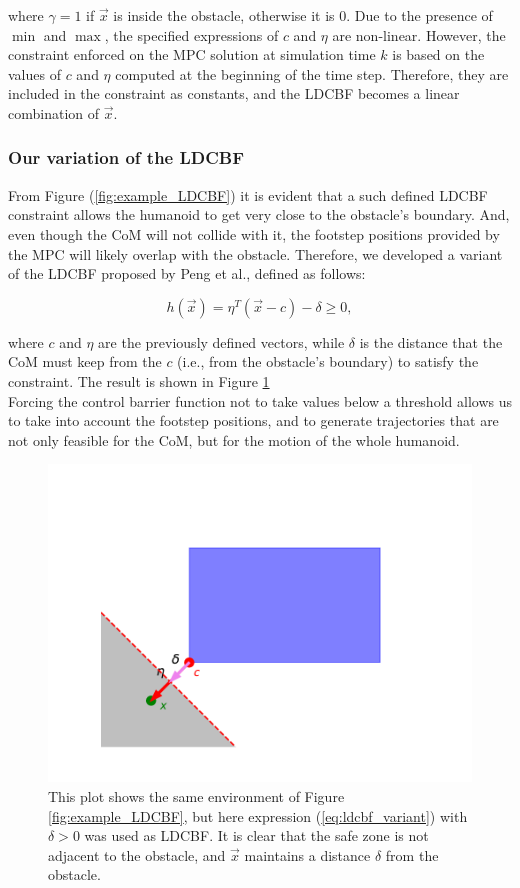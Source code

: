 where $\gamma=1$ if $\vec{x}$ is inside the obstacle, otherwise it is $0$.
Due to the presence of $\min$ and $\max$, the specified expressions of $c$ and $\eta$ are non-linear. However, the constraint enforced on the MPC solution at simulation time $k$ is based on the values of $c$ and $\eta$ computed at the beginning of the time step. Therefore, they are included in the constraint as constants, and the LDCBF becomes a linear combination of $\vec{x}$.

\subsubsection{Our variation of the LDCBF}
From Figure (\ref{fig:example_LDCBF}) it is evident that a such defined LDCBF constraint allows the humanoid to get very close to the obstacle's boundary. And, even though the CoM will not collide with it, the footstep positions provided by the MPC will likely overlap with the obstacle. Therefore, we developed a variant of the LDCBF proposed by Peng et al., defined as follows:

\begin{equation} \label{eq:ldcbf_variant}
h\left(\vec{x}\right) = \eta^T \left(\vec{x} - c\right) - \delta \geq 0,
\end{equation}

where $c$ and $\eta$ are the previously defined vectors, while $\delta$ is the distance that the CoM must keep from the $c$ (i.e., from the obstacle's boundary) to satisfy the constraint. The result is shown in Figure \ref{fig:example_LDCBF_variant}\\
Forcing the control barrier function not to take values below a threshold allows us to take into account the footstep positions, and to generate trajectories that are not only feasible for the CoM, but for the motion of the whole humanoid.

\begin{figure}[h]
    \centering
    \includegraphics[width=0.75\linewidth]{figures//MPC/example_ldcbf_variant.pdf}
    \caption{This plot shows the same environment of Figure \ref{fig:example_LDCBF}, but here expression (\ref{eq:ldcbf_variant}) with $\delta > 0$ was used as LDCBF. It is clear that the safe zone is not adjacent to the obstacle, and $\vec{x}$ maintains a distance $\delta$ from the obstacle.}
    \label{fig:example_LDCBF_variant}
\end{figure}